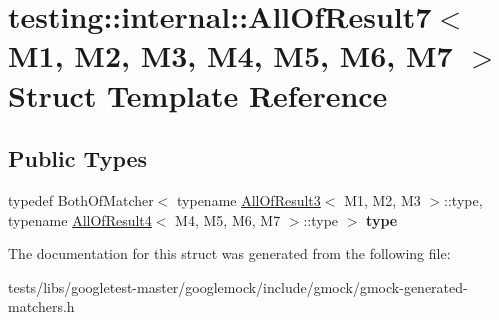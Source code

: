 \hypertarget{structtesting_1_1internal_1_1AllOfResult7}{}\section{testing\+:\+:internal\+:\+:All\+Of\+Result7$<$ M1, M2, M3, M4, M5, M6, M7 $>$ Struct Template Reference}
\label{structtesting_1_1internal_1_1AllOfResult7}
\subsection*{Public Types}
\begin{DoxyCompactItemize}
\item 
\mbox{\label{structtesting_1_1internal_1_1AllOfResult7_a47ab0d670258434b0e65530591948e8c}} 
typedef Both\+Of\+Matcher$<$ typename \hyperlink{structtesting_1_1internal_1_1AllOfResult3}{All\+Of\+Result3}$<$ M1, M2, M3 $>$\+::type, typename \hyperlink{structtesting_1_1internal_1_1AllOfResult4}{All\+Of\+Result4}$<$ M4, M5, M6, M7 $>$\+::type $>$ {\bfseries type}
\end{DoxyCompactItemize}


The documentation for this struct was generated from the following file\+:\begin{DoxyCompactItemize}
\item 
tests/libs/googletest-\/master/googlemock/include/gmock/gmock-\/generated-\/matchers.\+h\end{DoxyCompactItemize}
